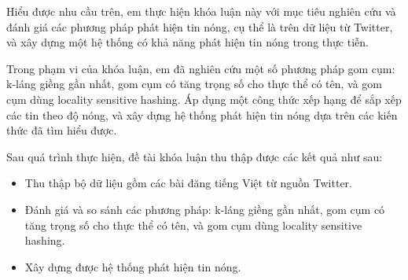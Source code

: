 
Hiểu được nhu cầu trên, em thực hiện khóa luận này với mục tiêu nghiên cứu và đánh giá các phương pháp phát hiện tin nóng, cụ thể là trên dữ liệu từ Twitter, và xây dựng một hệ thống có khả năng phát hiện tin nóng trong thực tiễn.

Trong phạm vi của khóa luận, em đã nghiên cứu một số phương pháp gom cụm: k-láng giềng gần nhất, gom cụm có tăng trọng số cho thực thể có tên, và gom cụm dùng locality sensitive hashing. Áp dụng một công thức xếp hạng để sắp xếp các tin theo độ nóng, và xây dựng hệ thống phát hiện tin nóng dựa trên các kiến thức đã tìm hiểu được.

Sau quá trình thực hiện, đề tài khóa luận thu thập được các kết quả như sau:
	\begin{itemize}
		\item Thu thập bộ dữ liệu gồm các bài đăng tiếng Việt từ nguồn Twitter.
		\item Đánh giá và so sánh các phương pháp: k-láng giềng gần nhất, gom cụm có tăng trọng số cho thực thể có tên, và gom cụm dùng locality sensitive hashing.
		\item Xây dựng được hệ thống phát hiện tin nóng.
	\end{itemize}


 

